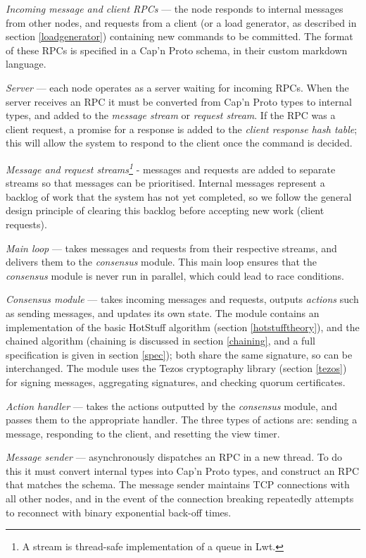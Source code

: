 \begin{description}
	\item \textit{Incoming message and client RPCs} --- the node responds to internal messages from other nodes, and requests from a client (or a load generator, as described in section \ref{loadgenerator}) containing new commands to be committed. The format of these RPCs is specified in a Cap'n Proto schema, in their custom markdown language.
	\item \textit{Server} --- each node operates as a server waiting for incoming RPCs. When the server receives an RPC it must be converted from Cap'n Proto types to internal types, and added to the \textit{message stream} or \textit{request stream}. If the RPC was a client request, a promise for a response is added to the \textit{client response hash table}; this will allow the system to respond to the client once the command is decided.
	\item \textit{Message and request streams\footnote{A stream is thread-safe implementation of a queue in Lwt.}} - messages and requests are added to separate streams so that messages can be prioritised. Internal messages represent a backlog of work that the system has not yet completed, so we follow the general design principle of clearing this backlog before accepting new work (client requests).
	\item \textit{Main loop} --- takes messages and requests from their respective streams, and delivers them to the \textit{consensus} module. This main loop ensures that the \textit{consensus} module is never run in parallel, which could lead to race conditions.
	\item \textit{Consensus module} --- takes incoming messages and requests, outputs \textit{actions} such as sending messages, and updates its own state. The module contains an implementation of the basic HotStuff algorithm (section \ref{hotstufftheory}), and the chained algorithm (chaining is discussed in section \ref{chaining}, and a full specification is given in section \ref{spec}); both share the same signature, so can be interchanged. The module uses the Tezos cryptography library (section \ref{tezos}) for signing messages, aggregating signatures, and checking quorum certificates.
	\item \textit{Action handler} --- takes the actions outputted by the \textit{consensus} module, and passes them to the appropriate handler. The three types of actions are: sending a message, responding to the client, and resetting the view timer.
	\item \textit{Message sender} --- asynchronously dispatches an RPC in a new thread. To do this it must convert internal types into Cap'n Proto types, and construct an RPC that matches the schema. The message sender maintains TCP connections with all other nodes, and in the event of the connection breaking repeatedly attempts to reconnect with binary exponential back-off times.

\end{description}
